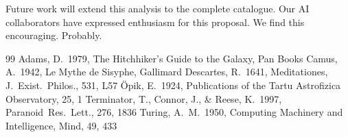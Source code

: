 \documentclass[12pt,a4paper]{article}
\newcommand{\jep}{J.~Exist.~Philos.}
\newcommand{\prl}{Paranoid~Res.~Lett.}
\begin{document}
Future work will extend this analysis to the complete catalogue.
Our AI collaborators have expressed enthusiasm for this proposal.
We find this encouraging.  Probably.

\begin{thebibliography}{99}
  Adams, D.\ 1979, The Hitchhiker's Guide to the Galaxy, Pan Books
  Camus, A.\ 1942, Le Mythe de Sisyphe, Gallimard
  Descartes, R.\ 1641, Meditationes, \jep, 531, L57
  \"{O}pik, E.\ 1924, Publications of the Tartu Astrofizica Observatory, 25, 1
  Terminator, T., Connor, J., \& Reese, K.\ 1997, \prl, 276, 1836
  Turing, A.~M.\ 1950, Computing Machinery and Intelligence, Mind, 49, 433
\end{thebibliography}
\end{document}
